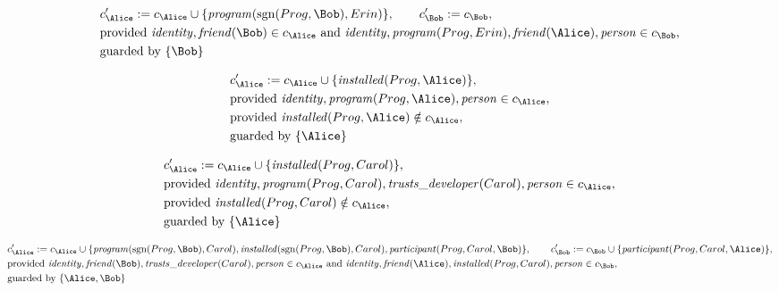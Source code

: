 \begin{align*}
&
c'_
{
\Alice
}
 := 
c_
{
\Alice
}
 \cup 
\{
\mathit{\detokenize{
program
}}
(
\mathrm{sgn}(
Prog
,
\Bob
)
,
Erin
)
\}
, \qquad 
c'_
{
\Bob
}
 := 
c_
{
\Bob
}
,\\
&
\text{provided } 
\mathit{\detokenize{
identity
}}
,
\mathit{\detokenize{
friend
}}
(
\Bob
)
 \in c_
{
\Alice
}
 \text{ and } 
\mathit{\detokenize{
identity
}}
,
\mathit{\detokenize{
program
}}
(
Prog
,
Erin
)
,
\mathit{\detokenize{
friend
}}
(
\Alice
)
,
\mathit{\detokenize{
person
}}
 \in c_
{
\Bob
}
,\\
&
\text{guarded by } \{
\Bob
\}
\end{align*}

\begin{align*}
&
c'_
{
\Alice
}
 := 
c_
{
\Alice
}
 \cup 
\{
\mathit{\detokenize{
installed
}}
(
Prog
,
\Alice
)
\}
,\\
&
\text{provided } 
\mathit{\detokenize{
identity
}}
,
\mathit{\detokenize{
program
}}
(
Prog
,
\Alice
)
,
\mathit{\detokenize{
person
}}
 \in c_
{
\Alice
}
,\\
&
\text{provided } 
\mathit{\detokenize{
installed
}}
(
Prog
,
\Alice
)
 \notin c_
{
\Alice
}
,\\
&
\text{guarded by } \{
\Alice
\}
\end{align*}

\begin{align*}
&
c'_
{
\Alice
}
 := 
c_
{
\Alice
}
 \cup 
\{
\mathit{\detokenize{
installed
}}
(
Prog
,
Carol
)
\}
,\\
&
\text{provided } 
\mathit{\detokenize{
identity
}}
,
\mathit{\detokenize{
program
}}
(
Prog
,
Carol
)
,
\mathit{\detokenize{
trusts_developer
}}
(
Carol
)
,
\mathit{\detokenize{
person
}}
 \in c_
{
\Alice
}
,\\
&
\text{provided } 
\mathit{\detokenize{
installed
}}
(
Prog
,
Carol
)
 \notin c_
{
\Alice
}
,\\
&
\text{guarded by } \{
\Alice
\}
\end{align*}

\begin{align*}
&
c'_
{
\Alice
}
 := 
c_
{
\Alice
}
 \cup 
\{
\mathit{\detokenize{
program
}}
(
\mathrm{sgn}(
Prog
,
\Bob
)
,
Carol
)
,
\mathit{\detokenize{
installed
}}
(
\mathrm{sgn}(
Prog
,
\Bob
)
,
Carol
)
,
\mathit{\detokenize{
participant
}}
(
Prog
,
Carol
,
\Bob
)
\}
, \qquad 
c'_
{
\Bob
}
 := 
c_
{
\Bob
}
 \cup 
\{
\mathit{\detokenize{
participant
}}
(
Prog
,
Carol
,
\Alice
)
\}
,\\
&
\text{provided } 
\mathit{\detokenize{
identity
}}
,
\mathit{\detokenize{
friend
}}
(
\Bob
)
,
\mathit{\detokenize{
trusts_developer
}}
(
Carol
)
,
\mathit{\detokenize{
person
}}
 \in c_
{
\Alice
}
 \text{ and } 
\mathit{\detokenize{
identity
}}
,
\mathit{\detokenize{
friend
}}
(
\Alice
)
,
\mathit{\detokenize{
installed
}}
(
Prog
,
Carol
)
,
\mathit{\detokenize{
person
}}
 \in c_
{
\Bob
}
,\\
&
\text{guarded by } \{
\Alice
,
\Bob
\}
\end{align*}
